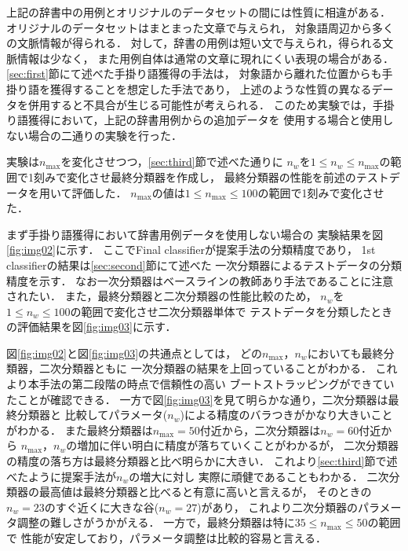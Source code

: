 \documentclass[japanese]{jnlp_1.4}
\begin{document}
上記の辞書中の用例とオリジナルのデータセットの間には性質に相違がある．
オリジナルのデータセットはまとまった文章で与えられ，
対象語周辺から多くの文脈情報が得られる．
対して，辞書の用例は短い文で与えられ，得られる文脈情報は少なく，
また用例自体は通常の文章に現れにくい表現の場合がある．
\ref{sec:first}節にて述べた手掛り語獲得の手法は，
対象語から離れた位置からも手掛り語を獲得することを想定した手法であり，
上述のような性質の異なるデータを併用すると不具合が生じる可能性が考えられる．
このため実験では，手掛り語獲得において，上記の辞書用例からの追加データを
使用する場合と使用しない場合の二通りの実験を行った．

実験は$n_{\max}$を変化させつつ，\ref{sec:third}節で述べた通りに
$n_w$を$1 \leq n_w \leq n_{\max}$の範囲で1刻みで変化させ最終分類器を作成し，
最終分類器の性能を前述のテストデータを用いて評価した．
$n_{\max}$の値は$1 \leq n_{\max} \leq 100$の範囲で1刻みで変化させた．

まず手掛り語獲得において辞書用例データを使用しない場合の
実験結果を図\ref{fig:img02}に示す．
ここでFinal classifierが提案手法の分類精度であり，
1st classifierの結果は\ref{sec:second}節にて述べた
一次分類器によるテストデータの分類精度を示す．
なお一次分類器はベースラインの教師あり手法であることに注意されたい．
また，最終分類器と二次分類器の性能比較のため，
$n_w$を$1 \leq n_w \leq 100$の範囲で変化させ二次分類器単体で
テストデータを分類したときの評価結果を図\ref{fig:img03}に示す．

図\ref{fig:img02}と図\ref{fig:img03}の共通点としては，
どの$n_{\max}$，$n_w$においても最終分類器，二次分類器ともに
一次分類器の結果を上回っていることがわかる．
これより本手法の第二段階の時点で信頼性の高い
ブートストラッピングができていたことが確認できる．
一方で図\ref{fig:img03}を見て明らかな通り，二次分類器は最終分類器と
比較してパラメータ($n_w$)による精度のバラつきがかなり大きいことがわかる．
また最終分類器は$n_{\max} = 50$付近から，二次分類器は$n_w = 60$付近から
$n_{\max}$，$n_w$の増加に伴い明白に精度が落ちていくことがわかるが，
二次分類器の精度の落ち方は最終分類器と比べ明らかに大きい．
これより\ref{sec:third}節で述べたように提案手法が$n_w$の増大に対し
実際に頑健であることもわかる．
二次分類器の最高値は最終分類器と比べると有意に高いと言えるが，
そのときの$n_w = 23$のすぐ近くに大きな谷($n_w = 27$)があり，
これより二次分類器のパラメータ調整の難しさがうかがえる．
一方で，最終分類器は特に$35 \leq n_{\max} \leq 50$の範囲で
性能が安定しており，パラメータ調整は比較的容易と言える．
\end{document}
